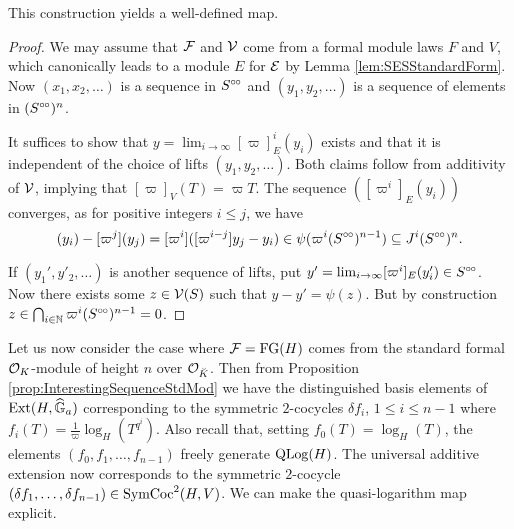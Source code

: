 \documentclass[../main.tex]{subfiles}
\begin{document}
\begin{prop}
  This construction yields a well-defined map. 
\begin{proof}
  We may assume that $\mathcal{F}$ and $\mathcal{V}$ come from a formal module laws $F$ and 
  $V$, which canonically
  leads to a module $E$ for $\mathcal{E}$ by Lemma \ref{lem:SESStandardForm}. Now
  $(x_1, x_2, \dots)$ is a sequence in $S^{\circ \hspace{-0.5pt} \circ}$ and $(y_1, y_2, \dots)$ is a
  sequence of elements in $(S^{\circ \hspace{-0.5pt} \circ})^n$.

  It suffices to show that $y = \lim_{i\to \infty} [\varpi]^i_E(y_i)$ exists and 
  that it is independent of the choice of lifts $(y_1, y_2, \dots)$. 
  Both claims follow from additivity of $\mathcal{V}$, implying that 
  $[\varpi]_{V}(T) = \varpi T$. The sequence 
  $([\varpi^i]_{E}(y_i))$ converges, as for positive integers $i\leq j$, we have 
  \begin{equation*}
    [\varpi^i](y_i) - [\varpi^j](y_j) = [\varpi^i]([\varpi^{i-j}]y_j - y_i)
    \in \psi(\varpi^i (S^\cici)^{n-1}) \subseteq J^i (S^\cici)^{n}. 
  \end{equation*}

  If $(y_1', y'_2, \dots)$ is another sequence of lifts, put
  $y' = \lim_{i \to \infty} [\varpi^i]_E (y_i') \in S^{\circ \hspace{-0.5pt} \circ}$. Now there exists some
  $z \in \mathcal{V}(S)$ such that 
  $y - y' = \psi(z)$. But by construction
  $z \in \bigcap_{i \in \mathbb{N}} \varpi^i(S^{{\circ \hspace{-0.5pt} \circ}})^{n-1} = 0$.
\end{proof}
\end{prop}

Let us now consider the case where $\mathcal{F} = \textnormal{FG}(H)$ comes from the standard
formal $\mathcal{O}_K$-module of height $n$ over $\mathcal{O}_{\breve K}$. Then 
from Proposition \ref{prop:InterestingSequenceStdMod} we have the distinguished
basis elements of $\operatorname{Ext}(H,\widehat{\mathbb{G}}_a)$ corresponding to the symmetric $2$-cocycles
$\delta f_i$, $1 \leq i \leq n-1$ where $f_i(T) = \frac 1 \varpi
\log_H(T^{q^i})$. Also recall that, setting $f_0(T) = \log_H(T)$, the elements 
$(f_0, f_1, \dots, f_{n-1})$ freely generate $\operatorname {QLog}(H)$. The universal
additive extension now corresponds to the symmetric $2$-cocycle $(\delta f_1,
\dots, \delta f_{n-1}) \in \operatorname{SymCoc}^2(H,V)$.
We can make the quasi-logarithm map explicit.
\end{document}
